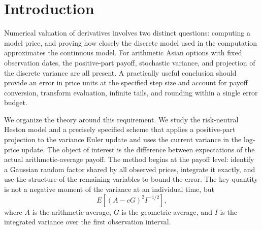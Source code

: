 \begin{abstract}
We develop finite error certificates for the bounded arithmetic Asian call spread
\(\psi(A)=(A-95)^+-(A-110)^+\), with twelve monthly fixings, in a specified Heston
model and its original positive-part variance Euler scheme. A common Gaussian
factor gives a nonnegative payoff remainder controlled by a weighted second
moment. Validated transform arithmetic includes projection corrections, integration
tails, inversion error, complex-logarithm branches, and rounding. At
\(\theta_*=(3,.045,.23,-.55,.045)\) and \(h=1/768\), the signed
Euler-minus-continuous price difference lies in
\[
[-0.011024692273,\;0.010642371599],
\]
and the continuous-model call-spread price lies in
\[
[6.508371733,\;6.518868974].
\]
A second initial-variance point has a complete certificate. The step-grid
comparison identifies a remainder-dominated width plateau, and
we derive the optimal common geometric scale for the exact nonlinear contribution.
Two auxiliary results have separate domains: a common first-order expansion
formula with explicit remainder bounds for nine puts and the Asian spread when
\(\xi=0\), and posterior target quantile displacement bounds on a restricted
continuous prior with \(\xi\in[10^{-7},10^{-6}]\). The contribution is the
weighted payoff structure and complete finite error accounting for the specified
original discrete kernel, supported by an executable numerical package.
\end{abstract}

\section{Introduction}

Numerical valuation of derivatives involves two distinct questions: computing a model price, and proving how closely the discrete model used in the computation approximates the continuous model. For arithmetic Asian options with fixed observation dates, the positive-part payoff, stochastic variance, and projection of the discrete variance are all present. A practically useful conclusion should provide an error in price units at the specified step size and account for payoff conversion, transform evaluation, infinite tails, and rounding within a single error budget.

We organize the theory around this requirement. We study the risk-neutral Heston model and a precisely specified scheme that applies a positive-part projection to the variance Euler update and uses the current variance in the log-price update. The object of interest is the difference between expectations of the actual arithmetic-average payoff. The method begins at the payoff level: identify a Gaussian random factor shared by all observed prices, integrate it exactly, and use the structure of the remaining variables to bound the error. The key quantity is not a negative moment of the variance at an individual time, but
\[
E\!\left[(A-cG)^2 I^{-1/2}\right],
\]
where \(A\) is the arithmetic average, \(G\) is the geometric average, and \(I\) is the integrated variance over the first observation interval.

